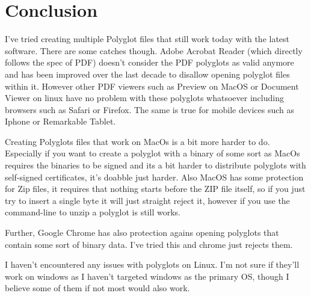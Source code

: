 \section{Conclusion}

I've tried creating multiple Polyglot files that still work today with the latest software. There are some catches though.
Adobe Acrobat Reader (which directly follows the spec of PDF) doesn't consider the PDF polyglots as valid anymore and has been
improved over the last decade to disallow opening polyglot files within it. However other PDF viewers such as Preview on MacOS or
Document Viewer on linux have no problem with these polyglots whatsoever including browsers such as Safari or Firefox. The same is true for mobile devices 
such as Iphone or Remarkable Tablet.

Creating Polyglots files that work on MacOs is a bit more harder to do. Especially if you want to create a polyglot with a binary of some sort
as MacOs requires the binaries to be signed and its a bit harder to distribute polyglots with self-signed certificates, it's doabble just harder.
Also MacOS has some protection for Zip files, it requires that nothing starts before the ZIP file itself, so if you just try to insert a single byte
it will just straight reject it, however if you use the command-line to unzip a polyglot is still works.

Further, Google Chrome has also protection agains opening polyglots that contain some sort of binary data. I've tried this and chrome just rejects them.

I haven't encountered any issues with polyglots on Linux. I'm not sure if they'll work on windows as I haven't targeted windows as the primary OS, though I believe
some of them if not most would also work.
